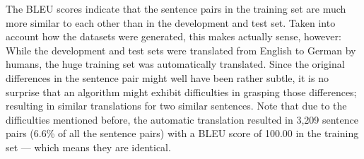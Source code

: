 













The BLEU scores indicate that the sentence pairs in the training set are much
more similar to each other than in the development and test set. Taken into account how
the datasets were generated, this makes actually sense, however: While the development
and test sets were translated from English to German by humans, the huge training set was
automatically translated. Since the original differences in the sentence pair might well
have been rather subtle, it is no surprise that an algorithm might exhibit difficulties in
grasping those differences; resulting in similar translations for two similar sentences.
Note that due to the difficulties mentioned before, the automatic translation resulted in
3,209 sentence pairs (6.6\% of all the sentence pairs) with a BLEU score of 100.00 in the
training set --- which means they are identical.


